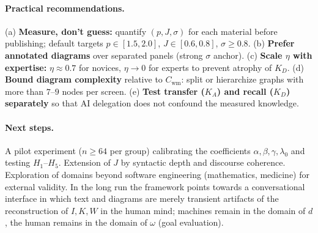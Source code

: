 \documentclass[10pt,a4paper]{article}
\begin{document}
\paragraph{Practical recommendations.}
(a) \textbf{Measure, don't guess:} quantify $(p, J, \sigma)$ for each
material before publishing; default targets $p \in [1.5, 2.0]$,
$J \in [0.6, 0.8]$, $\sigma \geq 0.8$.
(b) \textbf{Prefer annotated diagrams} over separated panels (strong
$\sigma$ anchor).
(c) \textbf{Scale $\eta$ with expertise:} $\eta \approx 0.7$ for
novices, $\eta \to 0$ for experts to prevent atrophy of $K_D$.
(d) \textbf{Bound diagram complexity} relative to $C_{\text{wm}}$:
split or hierarchize graphs with more than $7$--$9$ nodes per screen.
(e) \textbf{Test transfer ($K_A$) and recall ($K_D$) separately} so
that AI delegation does not confound the measured knowledge.

\paragraph{Next steps.}
A pilot experiment ($n \geq 64$ per group) calibrating the coefficients
$\alpha, \beta, \gamma, \lambda_0$ and testing $H_1$--$H_5$. Extension
of $J$ by syntactic depth and discourse coherence. Exploration of
domains beyond software engineering (mathematics, medicine) for
external validity. In the long run the framework points towards a
conversational interface in which text and diagrams are merely
transient artifacts of the reconstruction of $I, K, W$ in the human
mind; machines remain in the domain of $d$, the human remains in the
domain of $\omega$ (goal evaluation).
\end{document}
